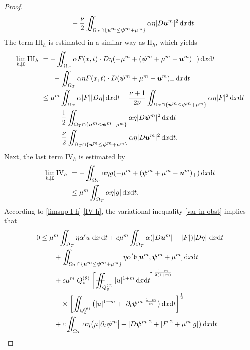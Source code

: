 \documentclass[a4paper, 10pt, american]{amsart}
\numberwithin{theorem}{section}
\numberwithin{equation}{section}
\newcommand{\dxdt}{\,\mathrm{d}x\mathrm{d}t}
\newcommand{\dx}{\,\mathrm{d}x}
\newcommand{\dt}{\,\mathrm{d}t}
\renewcommand{\rho}{\varrho}
\newcommand{\power}[2]{\bm{#1^{\mbox{\unboldmath{\scriptsize$#2$}}}}}
\def\Xiint#1{\mathchoice
    {\XXiint\displaystyle\textstyle{#1}}%
    {\XXiint\textstyle\scriptstyle{#1}}%
    {\XXiint\scriptstyle\scriptscriptstyle{#1}}%
    {\XXiint\scriptscriptstyle\scriptscriptstyle{#1}}%
    \!\iint}
\def\XXiint#1#2#3{\setbox0=\hbox{$#1{#2#3}{\iint}$}
    \vcenter{\hbox{$#2#3$}}\kern-0.5\wd0}
\def\biint{\Xiint{-\!-}}
\begin{document}
\begin{proof}
\begin{align}
  &\qquad-
  \frac{\nu}{2}\iint_{\Omega_T\cap\{\power um \le \power \psi m +\mu^m\}}\alpha\eta  |D\power um|^2\dxdt.
\end{align}
The term  $\mathrm{III}_h$ is estimated 
in a similar way as $\mathrm{II}_h$, which yields 
\begin{align}\label{III-h}
  \lim_{h\downarrow0}\mathrm{III}_h 
 &\ =
   -\iint_{\Omega_T}\alpha
   F(x,t)\cdot D\eta (-\mu^m+(\power\psi
    m+\mu^m-\power um)_+)\dxdt \nonumber\\
    &\qquad-
    \iint_{\Omega_T}\alpha
    \eta F(x,t)\cdot D(\power \psi m+\mu^m-\power um)_+\dxdt \nonumber\\
   &\ \le
   \mu^m \iint_{\Omega_T} \alpha |F||D\eta| \dxdt + 
   \frac{\nu+1}{2\nu}\iint_{\Omega_T\cap\{\power um\le\power \psi m+\mu^m\}} \alpha \eta |F|^2\dxdt \nonumber\\\nonumber
   &\qquad 
   +\frac12 \iint_{\Omega_T\cap\{\power um\le\power \psi m+\mu^m\}} \alpha \eta |D\power\psi m|^2 \dxdt \\
   &\qquad+ 
   \frac{\nu}2\iint_{\Omega_T\cap\{\power um\le\power\psi m+\mu^m\}} \alpha \eta |D\power um|^2 \dxdt.
\end{align}
Next, the last term $\mathrm{IV}_h$ is estimated by
\begin{align}\label{IV-h}
  \lim_{h\downarrow0}\mathrm{IV}_h
  &\ =
  -\iint_{\Omega_T} \alpha \eta g (-\mu^m + (\power\psi m + \mu^m - \power um)_+) \dxdt \\\nonumber
  &\ \le
  \mu^m \iint_{\Omega_T} \alpha \eta |g| \dxdt.
\end{align}
According to \eqref{limsup-I-h}-\eqref{IV-h},
the variational inequality \eqref{var-in-obst} implies that
\begin{align*}
	0&\le
	\mu^m\iint_{\Omega_T}\eta\alpha'u\,\dx\dt
	+ c\mu^m\iint_{\Omega_T}\alpha (|D\power um|+|F|)|D\eta|\,\dxdt\\
	&\qquad
	+\iint_{\Omega_T\cap\{\power um\le\power\psi m+\mu^m\}}
	\eta\alpha'\mathfrak{b}[\power um,\power\psi m+\mu^m]\dxdt\\
	&\qquad
	+
	c\mu^m|Q_\rho^{(\theta)}| \bigg[\biint_{Q_\rho^{(\theta)}} |u|^{1+m} \dxdt \bigg]^{\frac{1-m}{2(1+m)}}\\
	&\quad\quad\quad\times
	\bigg[\biint_{Q_\rho^{(\theta)}} \big( |u|^{1+m} + |\partial_t \power \psi {m}|^{\frac{1+m}m}\big) \dxdt\bigg]^{\frac{1}{2}}\\
	&\qquad
	+
	c\iint_{\Omega_T}\alpha\eta\big(\mu\big|\partial_t\power\psi m\big|+|D\power\psi m|^2 + |F|^2+\mu^m|g|\big) \dxdt
\end{align*}

\end{proof}
\end{document}
